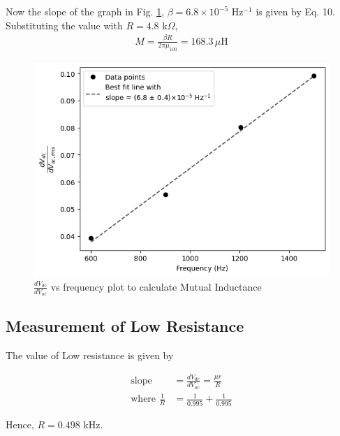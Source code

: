 Now the slope of the graph in Fig. \ref{g4}, $\beta=6.8 \times 10^{-5}$ Hz$^{-1}$ is given by Eq. 10. Substituting the value with $R=4.8$ k$\Omega$,
\begin{align*}
    M = \frac{\beta R}{2 \pi \mu_{100}} = 168.3\,\mu\text{H}
\end{align*}

\begin{figure}[H]
    \centering
    \includegraphics[width=0.9\columnwidth]{images/e2.png}
    \caption{$\frac{dV_{dc}}{dV_{ac}}$ vs frequency plot to calculate Mutual Inductance}
    \label{g4}
\end{figure}

\subsection{Measurement of Low Resistance}

The value of Low resistance is given by

\begin{align*}
    \text{slope }&=\frac{dV_{dc}}{dV_{ac}}=\frac{\mu r}{R}\\
    \text{where }\frac{1}{R} &= \frac{1}{0.995} + \frac{1}{0.995}
\end{align*}

Hence, $R=0.498$ kHz.



